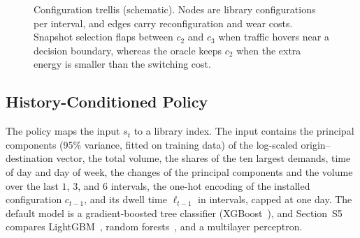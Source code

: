 \documentclass[5p,times]{elsarticle}
\begin{document}
\begin{figure}[t]
\centering
{}
\caption{Configuration trellis (schematic). Nodes are library configurations per interval, and edges carry reconfiguration and wear costs. Snapshot selection flaps between $c_2$ and $c_3$ when traffic hovers near a decision boundary, whereas the oracle keeps $c_2$ when the extra energy is smaller than the switching cost.}
\label{fig:trellis}
\end{figure}

\subsection{History-Conditioned Policy}

The policy maps the input $s_t$ to a library index. The input contains the principal components (95\% variance, fitted on training data) of the log-scaled origin--destination vector, the total volume, the shares of the ten largest demands, time of day and day of week, the changes of the principal components and the volume over the last $1$, $3$, and $6$ intervals, the one-hot encoding of the installed configuration $c_{t-1}$, and its dwell time $\ell_{t-1}$ in intervals, capped at one day. The default model is a gradient-boosted tree classifier (XGBoost~\cite{chen2016xgboost}), and Section~S5 compares LightGBM~\cite{ke2017lightgbm}, random forests~\cite{breiman2001rf}, and a multilayer perceptron.
\end{document}
